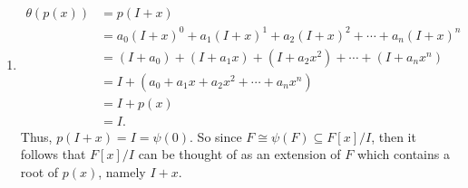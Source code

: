 \documentclass[12pt]{article}
\makeatletter
\theoremstyle{definition}
\theoremstyle{remark}
\renewenvironment{proof}[1][\proofname]{\par
  \pushQED{\qed}%
  \normalfont \topsep6\p@\@plus6\p@\relax
  \list{}{\leftmargin=0mm
          \rightmargin=4mm
          \settowidth{\itemindent}{\itshape#1}%
          \labelwidth=\itemindent
          \parsep=0pt \listparindent=\parindent 
  }
  \item[\hskip\labelsep
        \itshape
    #1\@addpunct{.}]\ignorespaces
}{%
  \popQED\endlist\@endpefalse
}
\let\oldproofname=\proofname
\renewcommand{\proofname}{\bf{\textit{\oldproofname}}}
\makeatother
\begin{document}
\begin{enumerate}[leftmargin=*]
\begin{proof}
                    \begin{equation*}
                        \begin{split}
                            \theta(p(x)) &= p(I+x) \\
                            &= a_0(I+x)^0+a_1(I+x)^1+a_2(I+x)^2+\cdots+a_n(I+x)^n \\
                            &= (I+a_0) +(I+a_1x)+(I+a_2x^2)+\cdots+(I+a_nx^n) \\
                            &= I+(a_0+a_1x+a_2x^2+\cdots+a_nx^n) \\
                            &= I+p(x) \\
                            &= I.
                        \end{split}
                    \end{equation*}
                Thus, $p(I+x)=I=\psi(0)$. So since $F\cong\psi(F)\subseteq F[x]/I$, then it follows that $F[x]/I$ can be thought of as an extension of $F$ which contains a root of $p(x)$, namely $I+x$.
            \end{proof}
    \end{enumerate}
\end{document}
